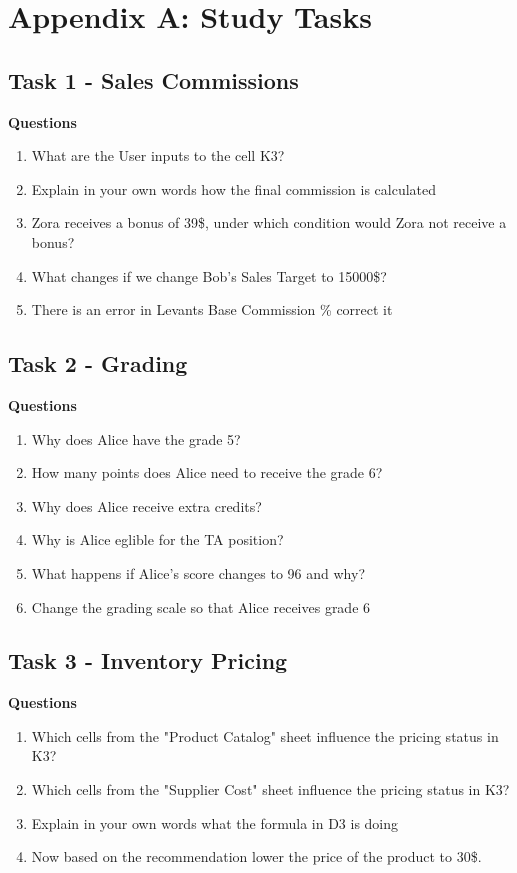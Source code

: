 
\chapter{Appendix A: Study Tasks}
    \section*{Task 1 - Sales Commissions}
    \textbf{Questions}
\begin{enumerate}
    \item What are the User inputs to the cell K3?
    \item Explain in your own words how the final commission is calculated
    \item Zora receives a bonus of 39\$, under which condition would Zora not receive a bonus?
    \item What changes if we change Bob's Sales Target to 15000\$?
    \item There is an error in Levants Base Commission \% correct it
\end{enumerate}

\begin{samepage}
\section*{Task 2 - Grading}
\textbf{Questions}
\begin{enumerate}
    \item Why does Alice have the grade 5?
    \item How many points does Alice need to receive the grade 6?
    \item Why does Alice receive extra credits?
    \item Why is Alice eglible for the TA position?
    \item What happens if Alice's score changes to 96 and why?
    \item Change the grading scale so that Alice receives grade 6
\end{enumerate}    
\end{samepage}

\begin{samepage}
 \section*{Task 3 - Inventory Pricing}
\textbf{Questions}
\begin{enumerate}
    \item Which cells from the "Product Catalog" sheet influence the pricing status in K3?
    \item Which cells from the "Supplier Cost" sheet influence the pricing status in K3?
    \item Explain in your own words what the formula in D3 is doing
    \item Now based on the recommendation lower the price of the product to 30\$.
\end{enumerate}   
\end{samepage}



